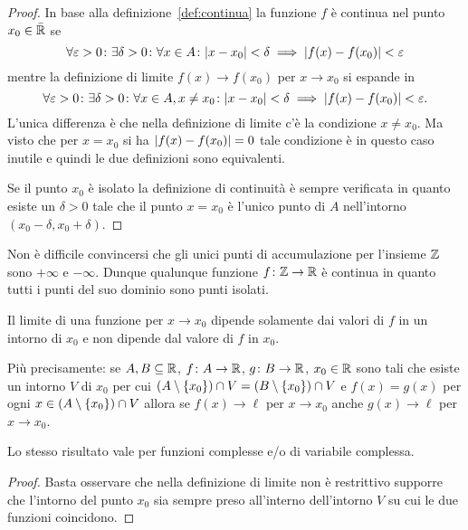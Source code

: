   \begin{proof}
  In base alla definizione~\ref{def:continua} la funzione $f$ è continua nel
  punto $x_0\in \bar {{\mathbb R}}$ se
  \[
   \forall \varepsilon>0 \colon \exists \delta >0 \colon
   \forall x \in A\colon
   {\left|x-x_0\right|}<\delta \implies {\left|f(x)-f(x_0)\right|} < \varepsilon
  \]
  mentre la definizione di limite $f(x)\to f(x_0)$ per $x\to x_0$
  si espande in
  \[
  \forall \varepsilon>0 \colon \exists \delta>0\colon
  \forall x \in A, x\neq x_0\colon
  {\left|x-x_0\right|}<\delta \implies {\left|f(x)-f(x_0)\right|} < \varepsilon.
  \]
  L'unica differenza è che nella definizione di limite
  c'è la condizione $x\neq x_0$. Ma visto che per $x=x_0$
  si ha ${\left|f(x)-f(x_0)\right|}=0$ tale condizione è in questo caso 
  inutile e quindi le due definizioni sono equivalenti.

  Se il punto $x_0$ è isolato la definizione di continuità
  è sempre verificata in quanto esiste un $\delta>0$ 
  tale che il punto $x=x_0$ è l'unico punto di $A$ 
  nell'intorno $(x_0-\delta,x_0+\delta)$.
  \end{proof}

\begin{example}
  Non è difficile convincersi che gli unici punti di accumulazione 
  per l'insieme ${\mathbb Z}$ sono $+\infty$ e $-\infty$.
  Dunque qualunque funzione $f\colon {\mathbb Z} \to {\mathbb R}$ è continua in quanto 
  tutti i punti del suo dominio sono punti isolati.
\end{example}
  
\begin{theorem}%
\label{th:localita_limite}%
Il limite di una funzione per $x\to x_0$ dipende solamente dai valori di $f$
in un intorno di $x_0$ e non dipende dal valore di $f$ in $x_0$.

Più precisamente: se $A,B\subseteq {\mathbb R}$, $f\colon A\to {\mathbb R}$, $g\colon B\to {\mathbb R}$, 
$x_0\in {\mathbb R}$ sono tali che 
esiste un intorno $V$ di $x_0$ per cui 
$(A\setminus{\left\{ x_0 \right\}}) \cap  V = (B\setminus {\left\{ x_0 \right\}}) \cap V$ 
e $f(x)=g(x)$ per ogni $x\in(A\setminus{\left\{ x_0 \right\}}) \cap  V$ 
allora se $f(x)\to \ell$ per $x\to x_0$ anche $g(x)\to \ell$ 
per $x\to x_0$.

Lo stesso risultato vale per funzioni complesse e/o di variabile complessa.
\end{theorem}
%
\begin{proof}
  Basta osservare che nella definizione di limite 
  non è restrittivo supporre che l'intorno del punto $x_0$ 
  sia sempre preso all'interno dell'intorno $V$ su cui 
  le due funzioni coincidono.
\end{proof}

